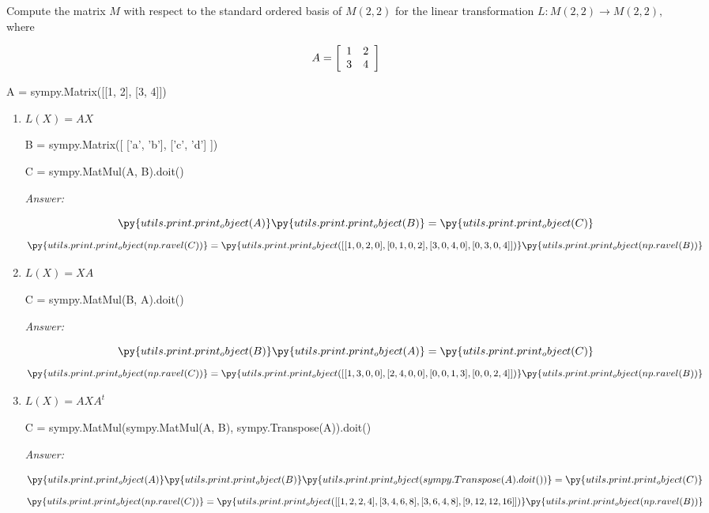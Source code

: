 \documentclass[letterpaper]{article}
\newcommand{\ans}{\textit{Answer: }}
\newenvironment{question}[2][Question]{\begin{trivlist}
\item[\hskip \labelsep {\bfseries #1}\hskip \labelsep {\bfseries #2.}]}{\end{trivlist}}
\newcommand{\printobj}[1]{\py{utils.print.print_object(#1)}}
\begin{document}
\begin{question}{3.126}
  Compute the matrix $M$ with respect to the standard ordered basis of $M ( 2,2 )$
  for the linear transformation $L : M ( 2,2 ) \rightarrow M ( 2,2 ) ,$ where

  $$
  A = \left[ \begin{array} { l l } { 1 } & { 2 } \\ { 3 } & { 4 } \end{array} \right]
  $$

  \begin{pycode}
A = sympy.Matrix([[1, 2], [3, 4]])
  \end{pycode}

  \begin{enumerate}[label=\textbf{(\alph*)}]
    \item $L ( X ) = A X$
    
    \begin{pycode}
B = sympy.Matrix([
  ['a', 'b'],
  ['c', 'd']
])

C = sympy.MatMul(A, B).doit()
    \end{pycode}

    \ans 

    $$\printobj{A} \printobj{B} = \printobj{C}$$
    $$\printobj{np.ravel(C)} 
    = \printobj{[
      [1, 0, 2, 0],
      [0, 1, 0, 2],
      [3, 0, 4, 0],
      [0, 3, 0, 4]
    ]} \printobj{np.ravel(B)}$$

    \item $L ( X ) = X A$
    
    \begin{pycode}
C = sympy.MatMul(B, A).doit()
    \end{pycode}

    \ans

    $$\printobj{B} \printobj{A} = \printobj{C}$$
    $$\printobj{np.ravel(C)} 
    = \printobj{[
      [1, 3, 0, 0],
      [2, 4, 0, 0],
      [0, 0, 1, 3],
      [0, 0, 2, 4]
    ]} \printobj{np.ravel(B)}$$
    
    \item $L ( X ) = A X A ^ { t }$
    
    \begin{pycode}
C = sympy.MatMul(sympy.MatMul(A, B), sympy.Transpose(A)).doit()
    \end{pycode}

    \ans 

    $$\printobj{A} \printobj{B} \printobj{sympy.Transpose(A).doit()} = \printobj{C}$$
    $$\printobj{np.ravel(C)} 
    = \printobj{[
      [1, 2, 2, 4],
      [3, 4, 6, 8],
      [3, 6, 4, 8],
      [9, 12, 12, 16]
    ]} \printobj{np.ravel(B)}$$



\end{enumerate}
\end{question}
\end{document}
